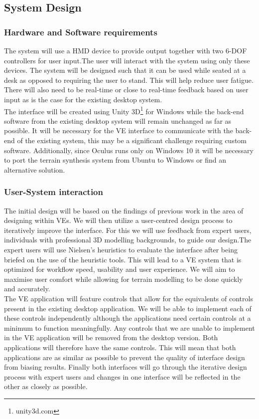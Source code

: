 \documentclass{sig-alternate-05-2015}
\begin{document}
\subsection{System Design}
\subsubsection{Hardware and Software requirements}
The system will use a HMD device to provide output together with two 6-DOF controllers for user input.The user will interact with the system using only these devices. The system will be designed such that it can be used while seated at a desk as opposed to requiring the user to stand. This will help reduce user fatigue\cite{Schultheis2012}. There will also need to be real-time or close to real-time feedback based on user input as is the case for the existing desktop system.\\

The interface will be created using Unity 3D\footnote{unity3d.com} for Windows while the back-end software from the existing desktop system will remain unchanged as far as possible. It will be necessary for the VE interface to communicate with the back-end of the existing system, this may be a significant challenge requiring custom software. Additionally, since Oculus runs only on Windows 10 it will be necessary to port the terrain synthesis system from Ubuntu to Windows or find an alternative solution.

\subsubsection{User-System interaction}
The initial design will be based on the findings of previous work in the area of designing within VEs. We will then utilize a user-centred design process to iteratively improve the interface. For this we will use feedback from expert users, individuals with professional 3D modelling backgrounds, to guide our design.The expert users will use Nielsen's heuristics\cite{nielsen1990heuristic} to evaluate the interface after being briefed on the use of the heuristic tools. This will lead to a VE system that is optimized for workflow speed, usability and user experience. We will aim to maximise user comfort while allowing for terrain modelling to be done quickly and accurately. \\

The VE application will feature controls that allow for the equivalents of controls present in the existing desktop application. We will be able to implement each of these controls independently although the applications need certain controls at a minimum to function meaningfully. Any controls that we are unable to implement in the VE application will be removed from the desktop version. Both applications will therefore have the same controls. This will mean that both applications are as similar as possible to prevent the quality of interface design from biasing results. Finally both interfaces will go through the iterative design process with expert users and changes in one interface will be reflected in the other as closely as possible.
\end{document}
